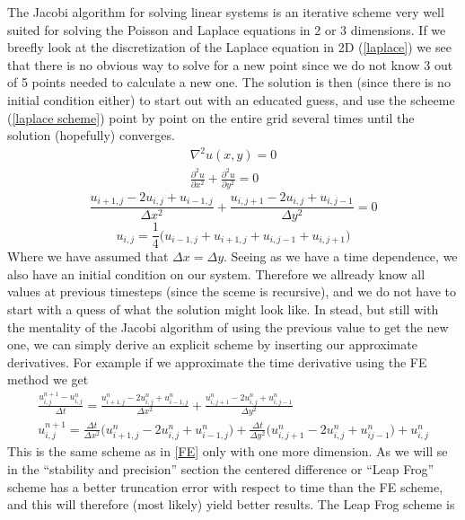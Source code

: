 \documentclass[a4paper,english, 10pt, twoside]{article}
\begin{document}
The Jacobi algorithm for solving linear systems is an iterative scheme very well suited for solving the Poisson and Laplace 
equations in 2 or 3 dimensions. If we breefly look at the discretization of the Laplace equation in 2D (\ref{laplace}) we see that 
there is no obvious way to solve for a new point since we do not know 3 out of 5 points needed to calculate a new one. The solution 
is then (since there is no initial condition either) to start out with an educated guess, and use the scheeme (\ref{laplace scheme}) 
point by point on the entire grid several times until the solution (hopefully) converges.
\begin{align*}
 \nabla^2u(x,y) = 0\\
 \frac{\partial^2 u}{\partial x^2} +  \frac{\partial^2 u}{\partial y^2} = 0 
\end{align*}
\begin{equation}\label{laplace}
 \frac{u_{i+1,j}-2u_{i,j}+u_{i-1,j}}{\Delta x^2} +  \frac{u_{i,j+1}-2u_{i,j}+u_{i,j-1}}{\Delta y^2} = 0
\end{equation}
\begin{equation}\label{laplace scheme}
u_{i,j} = \frac{1}{4}\Big(u_{i-1,j}+u_{i+1,j}+u_{i,j-1}+u_{i,j+1}\Big) 
\end{equation}
Where we have assumed that $\Delta x = \Delta y$. Seeing as we have a time dependence, we also have an initial condition on our 
system. Therefore we allready know all values at previous timesteps (since the sceme is recursive), and we do not have to start 
with a quess of what the solution might look like. In stead, but still with the mentality of the Jacobi algorithm of using the 
previous value to get the new one, we can simply derive an explicit scheme by inserting our approximate derivatives. For example 
if we approximate the time derivative using the FE method we get
\begin{align*}
 \frac{u^{n+1}_{i,j}-u^n_{i,j}}{\Delta t} = \frac{u^n_{i+1,j}-2u^n_{i,j} + u^n_{i-1,j}}{\Delta x^2}+ 
 \frac{u^n_{i,j+1}-2u^n_{i,j} + u^n_{i,j-1}}{\Delta y^2} \\
 u^{n+1}_{i,j} = \frac{\Delta t}{\Delta x^2}\big(u^n_{i+1,j}-2u^n_{i,j} + u^n_{i-1,j}\big) + 
 \frac{\Delta t}{\Delta y^2}\big(u^n_{i,j+1}-2u^n_{i,j} + u^n_{ij-1}\big) + u^n_{i,j}
\end{align*}
This is the same scheme as in \ref{FE} only with one more dimension. As we will se in the ``stability and precision'' section 
the centered difference or ``Leap Frog'' scheme has a better truncation error with respect to time than the FE scheme, and this 
will therefore (most likely) yield better results. The Leap Frog scheme is
\end{document}

